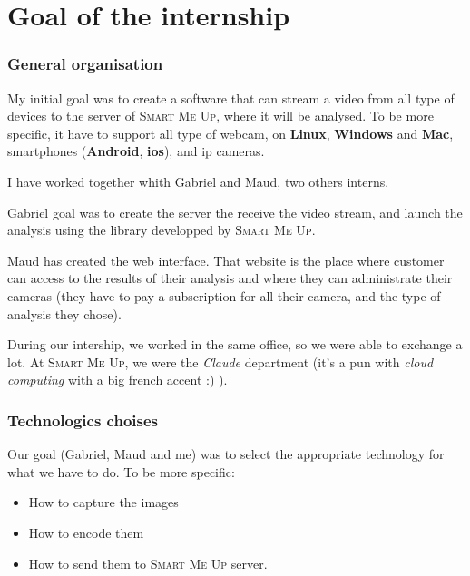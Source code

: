 \documentclass[a4paper,11pt]{custom}
\newcommand{\smu}{\textsc{Smart Me Up}}
\newcommand{\linux}{\textbf{Linux}}
\newcommand{\win}{\textbf{Windows}}
\newcommand{\mac}{\textbf{Mac}}
\newcommand{\android}{\textbf{Android}}
\newcommand{\ios}{\textbf{ios}}
\newcommand{\claude}{\textit{Claude}}
\begin{document}
\chapter{Goal of the internship}

\subsection{General organisation}

My initial goal was to create a software that can stream a video from all type of
devices to the server of \smu, where it will be analysed. To be more specific,
it have to support all type of webcam, on \linux, \win{} and \mac, smartphones
(\android, \ios), and ip cameras.

I have worked together whith Gabriel and Maud, two others interns.

Gabriel goal was to create the server the receive the video stream, and launch
the analysis using the library developped by \smu.

Maud has created the web interface. That website is the place where customer can
access to the results of their analysis and where they can administrate their
cameras (they have to pay a subscription for all their camera, and the type of
analysis they chose).

During our intership, we worked in the same office, so we were able to exchange
a lot. At \smu, we were the \claude{} department (it's a pun with \textit{cloud
computing} with a big french accent :) ).

\subsection{Technologics choises}

Our goal (Gabriel, Maud and me) was to select the appropriate technology for
what we have to do. To be more specific:
\begin{itemize}
\item How to capture the images
\item How to encode them
\item How to send them to \smu{} server.
\end{itemize}
\end{document}
